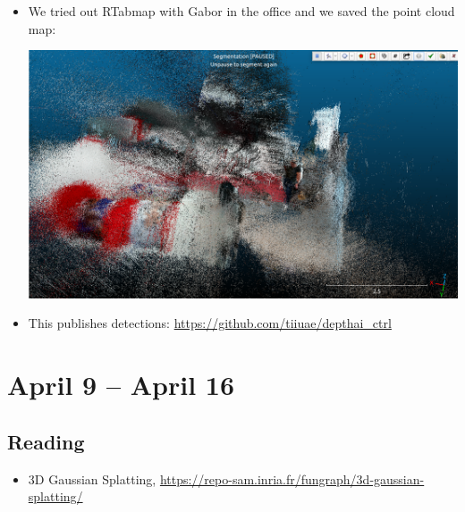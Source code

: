 \documentclass{article}
\begin{document}
\begin{itemize}
    \item We tried out RTabmap with Gabor in the office and we saved the point cloud map:\par
    \begin{minipage}{\linewidth}
        \centering
        \includegraphics[width=1\linewidth]{images/point_cloud_nokia_office.png}
    \end{minipage}\par

    \item This publishes detections: \url{https://github.com/tiiuae/depthai_ctrl}
    
\end{itemize}
\newpage

\section{April 9 -- April 16}
\subsection{Reading}
\begin{itemize}
\item 3D Gaussian Splatting, \url{https://repo-sam.inria.fr/fungraph/3d-gaussian-splatting/}
\end{itemize}
\end{document}
